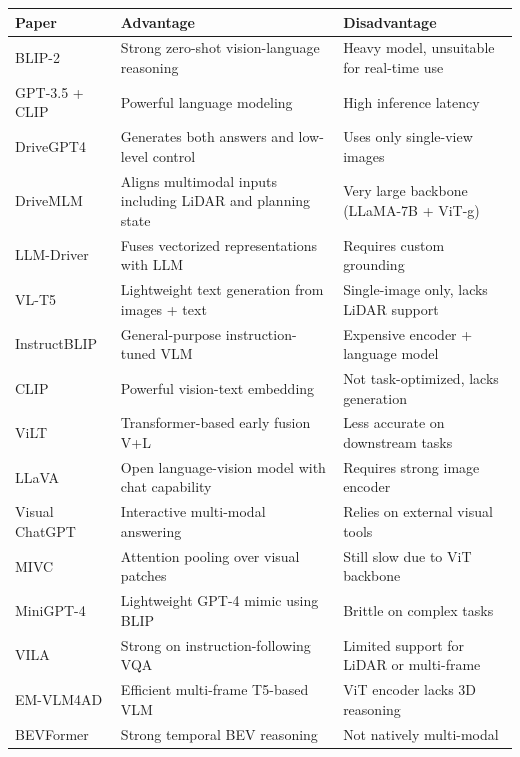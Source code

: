 \documentclass{article} %
\begin{document}
\begin{table}[htbp]
\centering
\small
\begin{tabular}{p{3.2cm} p{5.4cm} p{5.4cm}}
\toprule
\textbf{Paper} & \textbf{Advantage} & \textbf{Disadvantage} \\
\midrule
BLIP-2 \cite{li2023blip2} & Strong zero-shot vision-language reasoning & Heavy model, unsuitable for real-time use \\
GPT-3.5 + CLIP \cite{openai2023gpt4} & Powerful language modeling & High inference latency \\
DriveGPT4 \cite{xu2023drivegpt4} & Generates both answers and low-level control & Uses only single-view images \\
DriveMLM \cite{wang2023drivemlm} & Aligns multimodal inputs including LiDAR and planning state & Very large backbone (LLaMA-7B + ViT-g) \\
LLM-Driver \cite{chen2023driving} & Fuses vectorized representations with LLM & Requires custom grounding \\
VL-T5 \cite{cho2021unifying} & Lightweight text generation from images + text & Single-image only, lacks LiDAR support \\
InstructBLIP \cite{dai2023instructblip} & General-purpose instruction-tuned VLM & Expensive encoder + language model \\
CLIP \cite{radford2021learning} & Powerful vision-text embedding & Not task-optimized, lacks generation \\
ViLT \cite{kim2021vilt} & Transformer-based early fusion V+L & Less accurate on downstream tasks \\
LLaVA \cite{liu2023llava} & Open language-vision model with chat capability & Requires strong image encoder \\
Visual ChatGPT \cite{wu2023visualchatgpt} & Interactive multi-modal answering & Relies on external visual tools \\
MIVC \cite{wu2024mivc} & Attention pooling over visual patches & Still slow due to ViT backbone \\
MiniGPT-4 \cite{zhu2023minigpt4} & Lightweight GPT-4 mimic using BLIP & Brittle on complex tasks \\
VILA \cite{zhao2023vila} & Strong on instruction-following VQA & Limited support for LiDAR or multi-frame \\
EM-VLM4AD \cite{gopalkrishnan2024multi} & Efficient multi-frame T5-based VLM & ViT encoder lacks 3D reasoning \\
BEVFormer \cite{li2022bevformer} & Strong temporal BEV reasoning & Not natively multi-modal \\

\end{tabular}
\end{table}
\end{document}
